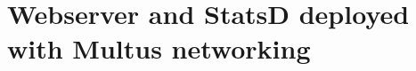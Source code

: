 \documentclass[english, 12pt, a4paper, sci, utf8, a-2b, online]{aaltothesis}
\begin{document}
\clearpage

\section{Webserver and StatsD deployed with Multus networking} \label{app:multus-sidecar}



\clearpage



\clearpage


\end{document}
